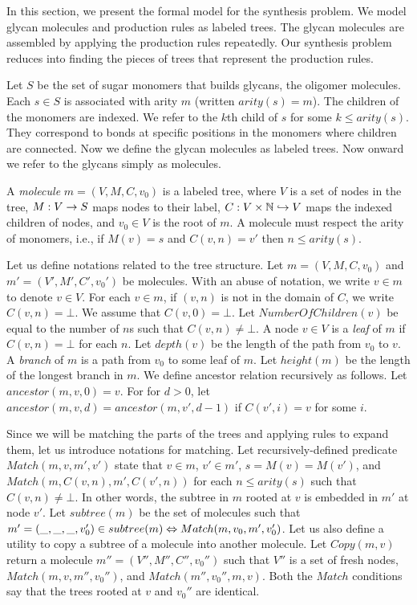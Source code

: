 
In this section, we present the formal model for the synthesis problem.
We model glycan molecules and production rules as labeled trees. The glycan molecules are assembled by applying the production rules repeatedly.
Our synthesis problem reduces into finding the pieces of trees that represent the production rules.

Let $S$ be the set of sugar monomers that builds glycans,
the oligomer molecules. Each $s \in S$ is associated with arity $m$ 
(written $arity(s) = m$).
The children of the monomers are indexed. We refer to the $k$th child of $s$ for some $k \leq arity(s)$.
They correspond to bonds at specific positions in the monomers where children are connected.
Now we define the glycan molecules as labeled trees. Now onward we refer to the glycans simply as molecules.

\begin{df}
A {\em molecule} $m = (V,M,C,v_0)$ is a labeled tree, where 
$V$ is a set of nodes in the tree,
$M : V \rightarrow S$ maps nodes to their label, 
$C : V \times \mathbb{N} \hookrightarrow V$ maps the indexed children of nodes, and
$v_0 \in V$ is the root of $m$.
A molecule must respect the arity of monomers, i.e., if $M(v) = s$ and $C(v,n) = v'$ then $n \leq arity(s)$.
\end{df}
Let us define notations related to the tree structure.
Let $\mathit{m = (V,M,C,v_0)}$ and $m' = (V',M',C',v_0')$ be molecules.
With an abuse of notation, we write $v \in m$ to denote $v \in V$.
For each $v \in m$, if $(v,n)$ is not in the domain of $C$, we write $C(v,n) = \bot$.
We assume that $C(v,0) = \bot$.
Let $NumberOfChildren(v)$ be equal to the number of $n$s such that $C(v,n) \neq \bot$. 
A node $v \in V$ is a {\em leaf} of $m$ if $C(v,n) = \bot$ for each $n$.
Let $depth(v)$ be the length of the path from $v_0$ to $v$.
A {\em branch} of $m$ is a path from $v_0$ to some leaf of $m$.
Let $height(m)$ be the length of the longest branch in $m$.
We define ancestor relation recursively as follows. Let $ancestor(m,v,0) = v$.
For for $d > 0$, let $ancestor(m,v,d) = ancestor(m,v', d-1)$ if $C(v',i) = v$ for some $i$.

Since we will be matching the parts of the trees and applying rules to expand them,
let us introduce notations for matching.
Let recursively-defined predicate $Match(m,v,m',v')$ state that 
$v \in m$, $v' \in m'$, $s = M(v) = M(v')$, and $Match( m, C(v,n), m', C(v',n) )$ for each $n \leq arity(s)$ such that $C(v,n) \neq \bot$.
In other words, the subtree in $m$ rooted at $v$ is embedded in $m'$ at node $v'$.
Let $subtree(m)$ be the set of molecules such that
$m' = (\_,\_,\_,v_0') \in subtree(m) \Leftrightarrow Match(m,v_0,m',v_0')$.
Let us also define a utility to copy a subtree of a molecule into another molecule.
Let $Copy(m,v)$ return a molecule $m'' = (V'',M'',C'',v_0'')$ such that 
$V''$ is a set of fresh nodes, $Match(m,v,m'',v_0'')$, and $Match(m'',v_0'',m,v)$.
Both the $Match$ conditions say that the trees rooted at
$v$ and $v_0''$ are identical.

